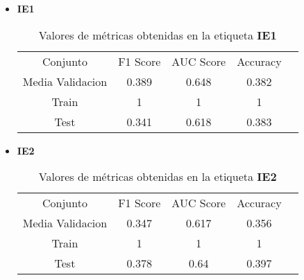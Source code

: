 \begin{itemize}
	\item \textbf{IE1}
	      \begin{table}[H]
		      \centering
		      \begin{tabular}{|c|c|c|c|c}
			      \cline{1-4}
			      Conjunto         & F1 Score & AUC Score & Accuracy \\ \cline{1-4}
			      Media Validacion & 0.389    & 0.648     & 0.382    \\ \cline{1-4}
			      Train            & 1        & 1         & 1        \\ \cline{1-4}
			      Test             & 0.341    & 0.618       & 0.383    \\ \cline{1-4}
		      \end{tabular}
		      \caption{Valores de métricas obtenidas en la etiqueta \textbf{IE1}}
	      \end{table}
	\item  \textbf{IE2}
	      \begin{table}[H]
		      \centering
		      \begin{tabular}{|c|c|c|c|c}
			      \cline{1-4}
			      Conjunto         & F1 Score & AUC Score & Accuracy \\ \cline{1-4}
			      Media Validacion & 0.347    & 0.617     & 0.356    \\ \cline{1-4}
			      Train            & 1        & 1         & 1        \\ \cline{1-4}
			      Test             & 0.378    & 0.64     & 0.397    \\ \cline{1-4}
		      \end{tabular}
		      \caption{Valores de métricas obtenidas en la etiqueta \textbf{IE2}}
	      \end{table}


\end{itemize}

